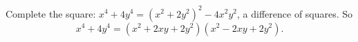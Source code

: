 Complete the square: $x^4+4y^4=(x^2+2y^2)^2-4x^2y^2$, a difference of squares. So
\[x^4+4y^4=\boxed{\left(x^2+2xy+2y^2\right)\left(x^2-2xy+2y^2\right)}.\]
